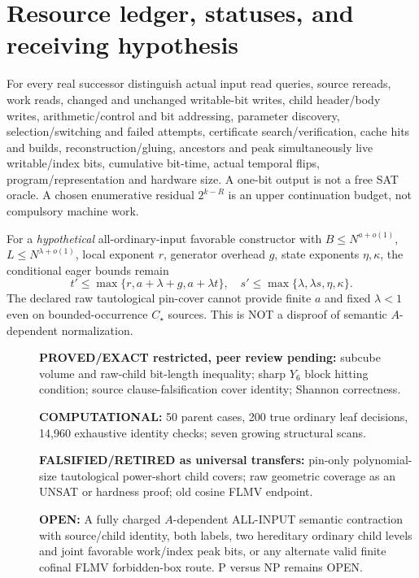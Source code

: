\documentclass[11pt]{article}
\begin{document}
\section{Resource ledger, statuses, and receiving hypothesis}
For every real successor distinguish actual input
read queries, source rereads, work reads,
changed and unchanged writable-bit writes,
child header/body writes, arithmetic/control
and bit addressing, parameter discovery,
selection/switching and failed attempts,
certificate search/verification, cache hits
and builds, reconstruction/gluing,
ancestors and peak simultaneously live
writable/index bits, cumulative bit-time,
actual temporal flips, program/representation
and hardware size. A one-bit output is
not a free SAT oracle. A chosen enumerative
residual $2^{k-R}$ is an upper continuation
budget, not compulsory machine work.

For a \emph{hypothetical} all-ordinary-input
favorable constructor with
$B\le N^{a+o(1)}$,
$L\le N^{\lambda+o(1)}$,
local exponent $r$, generator overhead $g$,
state exponents $\eta,\kappa$, the
conditional eager bounds remain
\[
 t'\le\max\{r,a+\lambda+g,a+\lambda t\},\quad
 s'\le\max\{\lambda,\lambda s,\eta,\kappa\}.
\]
The declared raw tautological pin-cover
cannot provide finite $a$ and fixed
$\lambda<1$ even on bounded-occurrence
$C_\star$ sources. This is NOT a disproof
of semantic $A$-dependent normalization.

\begin{description}
\item[] \textbf{PROVED/EXACT restricted, peer review pending:}
subcube volume and raw-child bit-length
inequality; sharp $Y_6$ block hitting
condition; source clause-falsification
cover identity; Shannon correctness.
\item[] \textbf{COMPUTATIONAL:}
50 parent cases, 200 true ordinary leaf
decisions, 14,960 exhaustive identity
checks; seven growing structural scans.
\item[] \textbf{FALSIFIED/RETIRED as universal transfers:}
pin-only polynomial-size tautological
power-short child covers; raw geometric
coverage as an UNSAT or hardness proof;
old cosine FLMV endpoint.
\item[] \textbf{OPEN:}
A fully charged $A$-dependent ALL-INPUT
semantic contraction with source/child
identity, both labels, two hereditary
ordinary child levels and joint favorable
work/index peak bits, or any alternate
valid finite cofinal FLMV forbidden-box
route. P versus NP remains OPEN.
\end{description}
\end{document}
